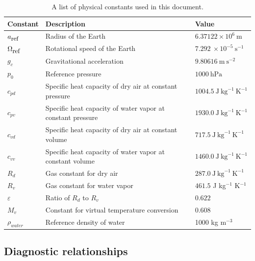 \documentclass[gmd, manuscript]{copernicus}
\begin{document}
\begin{table}[h]
\caption{A list of physical constants used in this document.} \label{tab:PhysicalConstants}
\begin{tabular*}{\textwidth}{@{\extracolsep{\fill}}lll}
\hline Constant & Description & Value \\
\hline $a_{\tiny \mbox{ref}}$ & Radius of the Earth & $6.37122 \times 10^{6}\ \mbox{m}$ \\
$\Omega_{\tiny \mbox{ref}}$ & Rotational speed of the Earth & $7.292\ \times 10^{-5}\ \mbox{s}^{-1}$ \\
$g_c$ & Gravitational acceleration & $9.80616\ \mbox{m}\ \mbox{s}^{-2}$ \\
$p_0$ & Reference pressure & $1000\ \mbox{hPa}$ \\
$c_{pd}$ & Specific heat capacity of dry air at constant pressure & $1004.5\ \mbox{J}\ \mbox{kg}^{-1}\ \mbox{K}^{-1}$ \\
$c_{pv}$ & Specific heat capacity of water vapor at constant pressure & $1930.0\ \mbox{J}\ \mbox{kg}^{-1}\ \mbox{K}^{-1}$ \\
$c_{vd}$ & Specific heat capacity of dry air at constant volume & $717.5\ \mbox{J}\ \mbox{kg}^{-1}\ \mbox{K}^{-1}$ \\
$c_{vv}$ & Specific heat capacity of water vapor at constant volume & $1460.0\ \mbox{J}\ \mbox{kg}^{-1}\ \mbox{K}^{-1}$ \\
$R_d$ & Gas constant for dry air & $287.0\ \mbox{J}\ \mbox{kg}^{-1}\ \mbox{K}^{-1}$ \\
$R_v$ & Gas constant for water vapor & $461.5$ J kg$^{-1}$ K$^{-1}$ \\
$\varepsilon$ & Ratio of $R_d$ to $R_v$ & $0.622$ \\
$M_v$ & Constant for virtual temperature conversion & $0.608$ \\
$\rho_{water}$ & Reference density of water & 1000 kg m$^{-3}$ \\
\hline 
\end{tabular*}
\end{table}

\subsection{Diagnostic relationships}
\end{document}
